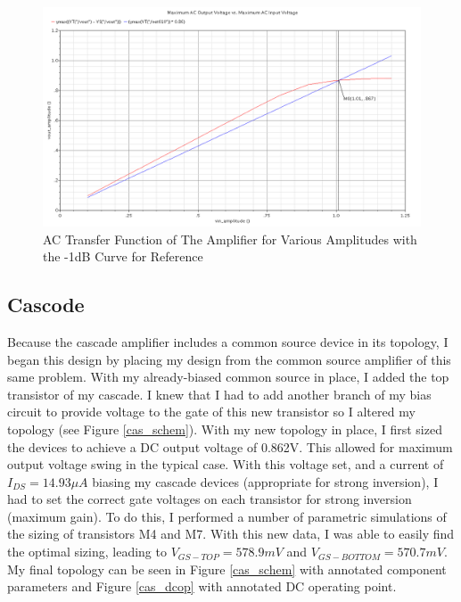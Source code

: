 \documentclass{article}
\begin{document}
\begin{figure}[H]
\centering
\includegraphics[width=6in]{2_cd_linearity.png}
\caption{AC Transfer Function of The Amplifier for Various Amplitudes with the -1dB Curve for Reference}
\label{cd_lin}
\end{figure}
\newpage


\subsection{Cascode}
Because the cascade amplifier includes a common source device in its topology, I began this design by placing my design from the common source amplifier of this same problem. With my already-biased common source in place, I added the top transistor of my cascade. I knew that I  had to add another branch of my bias circuit to provide voltage to the gate of this new transistor so I altered my topology (see Figure \ref{cas_schem}). With my new topology in place, I first sized the devices to achieve a DC output voltage of 0.862V. This allowed for maximum output voltage swing in the typical case. With this voltage set, and a current of $I_{DS} = 14.93\mu A$ biasing my cascade devices (appropriate for strong inversion), I had to set the correct gate voltages on each transistor for strong inversion (maximum gain). To do this, I performed a number of parametric simulations of the sizing of transistors M4 and M7. With this new data, I was able to easily find the optimal sizing, leading to $V_{GS-TOP} = 578.9mV$ and $V_{GS-BOTTOM} = 570.7mV$. My final topology can be seen in Figure \ref{cas_schem} with annotated component parameters and Figure \ref{cas_dcop} with annotated DC operating point.
\end{document}
